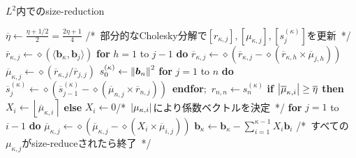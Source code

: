 \documentclass[12pt,aspectratio=169,table,dvipdfmx, leqno]{beamer}
\renewcommand{\Comment}[1]{\quad/*~#1~*/}
\newcommand{\round}[1]{\left\lfloor #1 \right\rceil}
\begin{document}
\begin{frame}{}
\begin{algorithm}[H]
    \footnotesize
    \begin{algorithmic}[1]
        \caption{\footnotesize $L^2$内でのsize-reduction}
        \label{alg_size_L2}
        \State $\overline{\eta}\gets\frac{\eta+1/2}{2}=\frac{2\eta+1}{4}$
        \Do
            \Comment{部分的なCholesky分解で$[r_{\kappa, j}], [\mu_{\kappa, j}], [s_{j}^{(\kappa)}]$を更新}
                \State $\overline{r}_{\kappa, j}\gets \diamond(\langle\bm{b}_\kappa, \bm{b}_j\rangle)$
                \State \textbf{for} $h=1$ to $j-1$ \textbf{do} $\overline{r}_{\kappa, j}\gets \diamond(\overline{r}_{\kappa, j}-\diamond(\overline{r}_{\kappa, h}\times\overline{\mu}_{j, h}))$
                \State $\overline{\mu}_{\kappa, j}\gets \diamond(\overline{r}_{\kappa, j}/\overline{r}_{j, j})$
            \EndFor
            \State $s_0^{(\kappa)}\gets \norm{\bm{b}_n}^2$
            \State \textbf{for} $j = 1$ to $n$ \textbf{do} $\overline{s}_j^{(\kappa)}\gets \diamond(\overline{s}_{j-1}^{(\kappa)}-\diamond(\overline{\mu}_{n, j}\times\overline{r}_{n, j}))$~\textbf{endfor};~$r_{n, n}\gets s_n^{(\kappa)}$
                \State \textbf{if} $\abs{\overline{\mu}_{\kappa, i}}\ge \overline{\eta}$ \textbf{then} $X_i\gets \round{\overline{\mu}_{\kappa, i}}$ \textbf{else} $X_i\gets 0$\Comment{$\abs{\mu_{\kappa, i}}$により係数ベクトルを決定}
                \State \textbf{for} $j=1$ to $i-1$ \textbf{do} $\overline{\mu}_{\kappa, j}\gets \diamond(\overline{\mu}_{\kappa, j}-\diamond(X_i\times\overline{\mu}_{i, j}))$
            \EndFor
            \State $\bm{b}_\kappa\gets \bm{b}_\kappa-\sum_{i=1}^{\kappa-1}X_i\bm{b}_i$
        \Comment{すべての$\mu_{\kappa, j}$がsize-reduceされたら終了}
    \end{algorithmic}
\end{algorithm}
\end{frame}
\end{document}
